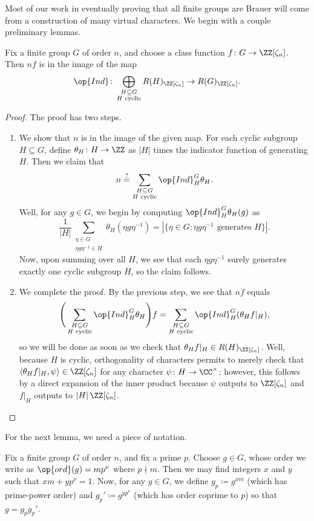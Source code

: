\documentclass[../thesis.tex]{subfiles}
\begin{document}
Most of our work in eventually proving that all finite groups are Brauer will come from a construction of many virtual characters. We begin with a couple preliminary lemmas.
\begin{lemma} \label{lem:divisible-char-is-induced}
	Fix a finite group $G$ of order $n$, and choose a class function $f\colon G\to\ZZ[\zeta_n]$. Then $nf$ is in the image of the map
	\[\op{Ind}\colon\bigoplus_{\substack{H\subseteq G\\H\text{ cyclic}}}R(H)_{\ZZ[\zeta_n]}\to R(G)_{\ZZ[\zeta_n]}.\]
\end{lemma}
\begin{proof}
	The proof has two steps.
	\begin{enumerate}
		\item We show that $n$ is in the image of the given map. For each cyclic subgroup $H\subseteq G$, define $\theta_H\colon H\to\ZZ$ as $\left|H\right|$ times the indicator function of generating $H$. Then we claim that
		\[n\stackrel?=\sum_{\substack{H\subseteq G\\H\text{ cyclic}}}\op{Ind}_H^G\theta_H.\]
		Well, for any $g\in G$, we begin by computing $\op{Ind}_H^G\theta_H(g)$ as
		\[\frac1{\left|H\right|}\sum_{\substack{\eta\in G\\\eta g\eta^{-1}\in H}}\theta_H\left(\eta g\eta^{-1}\right)=\left|\{\eta\in G:\eta g\eta^{-1}\text{ generates }H\}\right|.\]
		Now, upon summing over all $H$, we see that each $\eta g\eta^{-1}$ surely generates exactly one cyclic subgroup $H$, so the claim follows.
		\item We complete the proof. By the previous step, we see that $nf$ equals
		\[\Bigg(\sum_{\substack{H\subseteq G\\H\text{ cyclic}}}\op{Ind}_H^G\theta_H\Bigg)f=\sum_{\substack{H\subseteq G\\H\text{ cyclic}}}\op{Ind}_H^G(\theta_Hf|_H),\]
		so we will be done as soon as we check that $\theta_Hf|_H\in R(H)_{\ZZ[\zeta_n]}$. Well, because $H$ is cyclic, orthogonality of characters permits to merely check that $\langle\theta_Hf|_H,\psi\rangle\in\ZZ[\zeta_n]$ for any character $\psi\colon H\to\CC^\times$; however, this follows by a direct expansion of the inner product because $\psi$ outputs to $\ZZ[\zeta_n]$ and $f|_H$ outputs to $\left|H\right|\ZZ[\zeta_n]$.
		\qedhere
	\end{enumerate}
\end{proof}
For the next lemma, we need a piece of notation.
\begin{notation}
	Fix a finite group $G$ of order $n$, and fix a prime $p$. Choose $g\in G$, whose order we write as $\op{ord}(g)=mp^\nu$ where $p\nmid m$. Then we may find integers $x$ and $y$ such that $xm+yp^\nu=1$. Now, for any $g\in G$, we define $g_p\coloneqq g^{xm}$ (which has prime-power order) and $g_p'\coloneqq g^{yp^\nu}$ (which has order coprime to $p$) so that $g=g_pg_p'$.
\end{notation}
\end{document}
